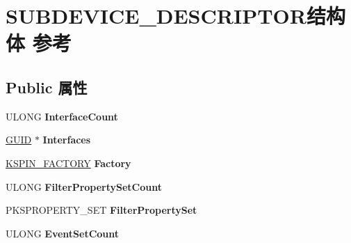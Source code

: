 \hypertarget{struct_s_u_b_d_e_v_i_c_e___d_e_s_c_r_i_p_t_o_r}{}\section{S\+U\+B\+D\+E\+V\+I\+C\+E\+\_\+\+D\+E\+S\+C\+R\+I\+P\+T\+O\+R结构体 参考}
\label{struct_s_u_b_d_e_v_i_c_e___d_e_s_c_r_i_p_t_o_r}
\subsection*{Public 属性}
\begin{DoxyCompactItemize}
\item 
\mbox{\label{struct_s_u_b_d_e_v_i_c_e___d_e_s_c_r_i_p_t_o_r_abcc6bdc1faae846c31d7f988d24b79b0}} 
U\+L\+O\+NG {\bfseries Interface\+Count}
\item 
\mbox{\label{struct_s_u_b_d_e_v_i_c_e___d_e_s_c_r_i_p_t_o_r_a980ae9bdc7a482557c14ab0ad35eff33}} 
\hyperlink{interface_g_u_i_d}{G\+U\+ID} $\ast$ {\bfseries Interfaces}
\item 
\mbox{\label{struct_s_u_b_d_e_v_i_c_e___d_e_s_c_r_i_p_t_o_r_a7c7fd299332d249a48c984ff8697561c}} 
\hyperlink{struct_k_s_p_i_n___f_a_c_t_o_r_y}{K\+S\+P\+I\+N\+\_\+\+F\+A\+C\+T\+O\+RY} {\bfseries Factory}
\item 
\mbox{\label{struct_s_u_b_d_e_v_i_c_e___d_e_s_c_r_i_p_t_o_r_a8e0ecba4670e58b36a59752b637bd528}} 
U\+L\+O\+NG {\bfseries Filter\+Property\+Set\+Count}
\item 
\mbox{\label{struct_s_u_b_d_e_v_i_c_e___d_e_s_c_r_i_p_t_o_r_a39e6c97c817f56d5fa59acf20a7afc73}} 
P\+K\+S\+P\+R\+O\+P\+E\+R\+T\+Y\+\_\+\+S\+ET {\bfseries Filter\+Property\+Set}
\item 
\mbox{\label{struct_s_u_b_d_e_v_i_c_e___d_e_s_c_r_i_p_t_o_r_a63670d8b719b6d224b21b99c370bb6ba}} 
U\+L\+O\+NG {\bfseries Event\+Set\+Count}
\item 

\end{DoxyCompactItemize}
